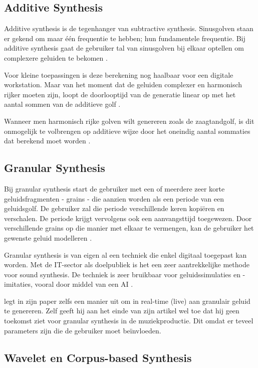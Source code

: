 \subsection{Additive Synthesis}

Additive synthesis is de tegenhanger van subtractive synthesis. Sinusgolven staan er gekend om maar één frequentie te hebben; hun fundamentele frequentie. Bij additive synthesis gaat de gebruiker tal van sinusgolven bij elkaar optellen om complexere geluiden te bekomen \autocite{additive}.

Voor kleine toepassingen is deze berekening nog haalbaar voor een digitale workstation. Maar van het moment dat de geluiden complexer en harmonisch rijker moeten zijn, loopt de doorlooptijd van de generatie linear op met het aantal sommen van de additieve golf \autocite{additive}.

Wanneer men harmonisch rijke golven wilt genereren zoals de zaagtandgolf, is dit onmogelijk te volbrengen op additieve wijze door het oneindig aantal sommaties dat berekend moet worden \autocite{harmonics}.

\subsection{Granular Synthesis}

Bij granular synthesis start de gebruiker met een of meerdere zeer korte geluidsfragmenten - grains - die aanzien worden als een periode van een geluidsgolf. De gebruiker zal die periode verschillende keren kopiëren en verschalen. De periode krijgt vervolgens ook een aanvangsttijd toegewezen. Door verschillende grains op die manier met elkaar te vermengen, kan de gebruiker het gewenste geluid modelleren \autocite{granular}.

Granular synthesis is van eigen al een techniek die enkel digitaal toegepast kan worden. Met de IT-sector als doelpubliek is het een zeer aantrekkelijke methode voor sound synthesis. De techniek is zeer bruikbaar voor geluidssimulaties en -imitaties, vooral door middel van een AI \autocite{granular}.

\textcite{granular} legt in zijn paper zelfs een manier uit om in real-time (live) aan granulair geluid te genereren. Zelf geeft hij aan het einde van zijn artikel wel toe dat hij geen toekomst ziet voor granular synthesis in de muziekproductie. Dit omdat er teveel parameters zijn die de gebruiker moet beïnvloeden.

\subsection{Wavelet en Corpus-based Synthesis}

